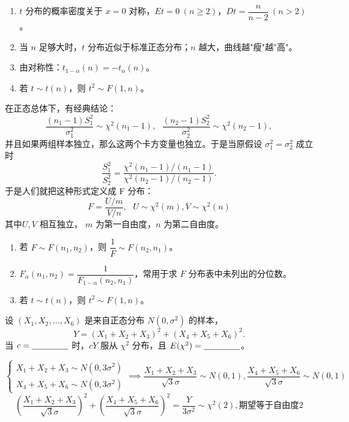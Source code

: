 \documentclass[lang=cn,11pt]{elegantbook}
\begin{document}
\begin{property}\label{prop:t-dist-property}
\begin{enumerate}
    \item \(t\) 分布的概率密度关于 \(x = 0\) 对称，\(Et = 0\ (n \geq 2)\)，\(Dt = \dfrac{n}{n-2}\ (n > 2)\)。
    \item 当 \(n\) 足够大时，\(t\) 分布近似于标准正态分布；\(n\) 越大，曲线越"瘦"越"高"。
    \item 由对称性：\(t_{1-\alpha}(n) = -t_\alpha(n)\)。
    \item 若 \(t \sim t(n)\)，则 \(t^2 \sim F(1,n)\)。
\end{enumerate}
\end{property}

\begin{definition}[\texorpdfstring{\(F\)}{F} 分布] \label{def:f-dist}
在正态总体下，有经典结论：
\[
\frac{(n_1-1)S_1^2}{\sigma_1^2}\sim \chi^2(n_1-1),~~~
\frac{(n_2-1)S_2^2}{\sigma_2^2}\sim \chi^2(n_2-1),
\]并且如果两组样本独立，那么这两个卡方变量也独立。于是当原假设 \(\sigma_1^2=\sigma_2^2\) 成立时
\[
\frac{S_1^2}{S_2^2}
=
\frac{\chi^2(n_1-1)/(n_1-1)}
{\chi^2(n_2-1)/(n_2-1)}.
\]于是人们就把这种形式定义成 F 分布：
\[
F=\frac{U/m}{V/n},~~~U\sim \chi^2(m), V\sim \chi^2(n)
\]
其中\(U,V\) 相互独立， \(m\) 为第一自由度，\(n\) 为第二自由度。
\end{definition}

\begin{property}\label{prop:f-dist-property}
\begin{enumerate}
    \item 若 \(F \sim F(n_1, n_2)\)，则 \(\dfrac{1}{F} \sim F(n_2, n_1)\)。
    \item \(F_{\alpha}(n_1, n_2) = \dfrac{1}{F_{1-\alpha}(n_2, n_1)}\)，常用于求 \(F\) 分布表中未列出的分位数。
    \item 若 \(t \sim t(n)\)，则 \(t^2 \sim F(1, n)\)。
\end{enumerate}
\end{property}


\begin{exercise}\label{exer:src-paper1-fill-05}\label{prob:p1-fill-05}
设 \((X_1,X_2,\dots,X_6)\) 是来自正态分布 \(N(0,\sigma^2)\) 的样本，
\[
Y=\left(X_1+X_2+X_3\right)^2+
\left(X_4+X_5+X_6\right)^2.
\]
当 \(c=\underline{\hspace{1.5cm}}\) 时，\(cY\) 服从 \(\chi^2\) 分布，且 \(E(\chi^2)=\underline{\hspace{1.5cm}}\)。
\end{exercise}
\begin{solution}
\[
\begin{cases}X_1+X_2+X_3\sim N(0,3\sigma^2)\\X_4+X_5+X_6\sim N(0,3\sigma^2)\end{cases}\implies\frac{X_1+X_2+X_3}{\sqrt{3}\sigma}\sim N(0,1),\frac{X_4+X_5+X_6}{\sqrt{3}\sigma}\sim N(0,1)
\]
\[(\frac{X_1+X_2+X_3}{\sqrt{3}\sigma})^2+(\frac{X_4+X_5+X_6}{\sqrt{3}\sigma})^2=\frac{Y}{3\sigma^2}\sim \chi^2(2),\text{期望等于自由度}2\]
\end{solution}
\end{document}
